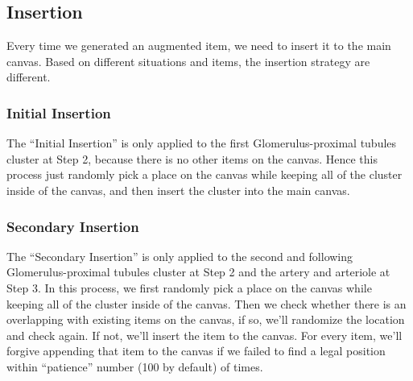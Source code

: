 \documentclass{article}
\begin{document}
\subsection{Insertion}
Every time we generated an augmented item, we need to insert it to the main canvas. Based on different situations and items, the insertion strategy are different.
\subsubsection{Initial Insertion}
The ``Initial Insertion'' is only applied to the first Glomerulus-proximal tubules cluster at Step 2, because there is no other items on the canvas. Hence this process just randomly pick a place on the canvas while keeping all of the cluster inside of the canvas, and then insert the cluster into the main canvas.
\subsubsection{Secondary Insertion}
The ``Secondary Insertion'' is only applied to the second and following Glomerulus-proximal tubules cluster at Step 2 and the artery and arteriole at Step 3. 
In this process, we first randomly pick a place on the canvas while keeping all of the cluster inside of the canvas. Then we check whether there is an overlapping with existing items on the canvas, if so, we'll randomize the location and check again. If not, we'll insert the item to the canvas. For every item, we'll forgive appending that item to the canvas if we failed to find a legal position within ``patience'' number (100 by default) of times.
\end{document}
